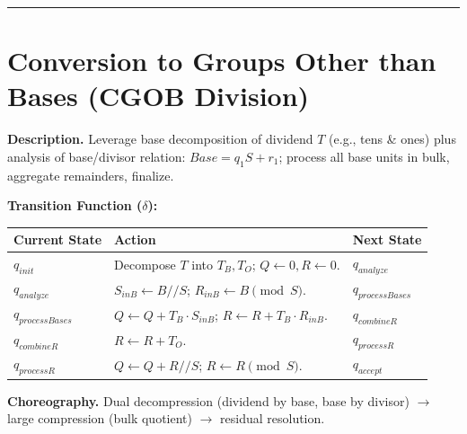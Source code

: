 \documentclass[12pt]{book}
\begin{document}
\begin{center}\rule{0.5\linewidth}{0.5pt}\end{center}

\section{Conversion to Groups Other than Bases (CGOB
Division)}\label{conversion-to-groups-other-than-bases-cgob-division}

\textbf{Description.} Leverage base decomposition of dividend \(T\)
(e.g., tens \& ones) plus analysis of base/divisor relation:
\(Base = q_1 S + r_1\); process all base units in bulk, aggregate
remainders, finalize.

\textbf{Transition Function (\(\delta\)):}

\begin{longtable}[]{@{}
  >{\raggedright\arraybackslash}p{}
  >{\raggedright\arraybackslash}p{}
  >{\raggedright\arraybackslash}p{}@{}}
\toprule\noalign{}
\begin{minipage}[b]{\linewidth}\raggedright
Current State
\end{minipage} & \begin{minipage}[b]{\linewidth}\raggedright
Action
\end{minipage} & \begin{minipage}[b]{\linewidth}\raggedright
Next State
\end{minipage} \\
\midrule\noalign{}
\endhead
\bottomrule\noalign{}
\endlastfoot
\(q_{init}\) & Decompose \(T\) into \(T_B, T_O\);
\(Q \leftarrow 0, R \leftarrow 0\). & \(q_{analyze}\) \\
\(q_{analyze}\) & \(S_{inB} \leftarrow B // S\);
\(R_{inB} \leftarrow B \pmod S\). & \(q_{processBases}\) \\
\(q_{processBases}\) & \(Q \leftarrow Q + T_B \cdot S_{inB}\);
\(R \leftarrow R + T_B \cdot R_{inB}\). & \(q_{combineR}\) \\
\(q_{combineR}\) & \(R \leftarrow R + T_O\). & \(q_{processR}\) \\
\(q_{processR}\) & \(Q \leftarrow Q + R // S\);
\(R \leftarrow R \pmod S\). & \(q_{accept}\) \\
\end{longtable}

\textbf{Choreography.} Dual decompression (dividend by base, base by
divisor) \(\to\) large compression (bulk quotient) \(\to\) residual
resolution.
\end{document}
